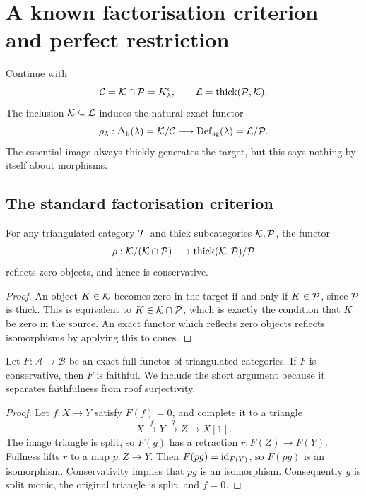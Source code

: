 
\section{A known factorisation criterion and perfect restriction}\label{sec:comparison}

Continue with
\[
 \mathcal C=\mathcal K\cap\mathcal P=K^c_\lambda,
 \qquad
 \mathcal L=\operatorname{thick}(\mathcal P,\mathcal K).
\]
The inclusion \(\mathcal K\subseteq\mathcal L\) induces the natural exact functor
\begin{equation}\label{eq:rho}
 \rho_\lambda:
 \Delta_{\mathrm b}(\lambda)=\mathcal K/\mathcal C
 \longrightarrow
 \operatorname{Def}_{\mathrm{sg}}(\lambda)=\mathcal L/\mathcal P.
\end{equation}
The essential image always thickly generates the target, but this says nothing by itself about morphisms.

\subsection{The standard factorisation criterion}

\begin{lemma}\label{lem:rho-conservative}
For any triangulated category \(\mathcal T\) and thick subcategories \(\mathcal K,\mathcal P\), the functor
\[
 \rho:\mathcal K/(\mathcal K\cap\mathcal P)
 \longrightarrow
 \operatorname{thick}(\mathcal K,\mathcal P)/\mathcal P
\]
reflects zero objects, and hence is conservative.
\end{lemma}

\begin{proof}
An object \(K\in\mathcal K\) becomes zero in the target if and only if
\(K\in\mathcal P\), since \(\mathcal P\) is thick.  This is equivalent to
\(K\in\mathcal K\cap\mathcal P\), which is exactly the condition that \(K\) be zero in the source.  An exact functor which reflects zero objects reflects isomorphisms by applying this to cones.
\end{proof}

\begin{lemma}\label{lem:full-conservative}
Let \(F:\mathcal A\to\mathcal B\) be an exact full functor of triangulated categories.  If \(F\) is conservative, then \(F\) is faithful.  We include the short argument because it separates faithfulness from roof surjectivity.
\end{lemma}

\begin{proof}
Let \(f:X\to Y\) satisfy \(F(f)=0\), and complete it to a triangle
\[
 X\xrightarrow{f}Y\xrightarrow{g}Z\longrightarrow X[1].
\]
The image triangle is split, so \(F(g)\) has a retraction
\(r:F(Z)\to F(Y)\).  Fullness lifts \(r\) to a map \(p:Z\to Y\).  Then
\(F(pg)=\operatorname{id}_{F(Y)}\), so \(F(pg)\) is an isomorphism.  Conservativity implies that \(pg\) is an isomorphism.  Consequently \(g\) is split monic, the original triangle is split, and \(f=0\).
\end{proof}


